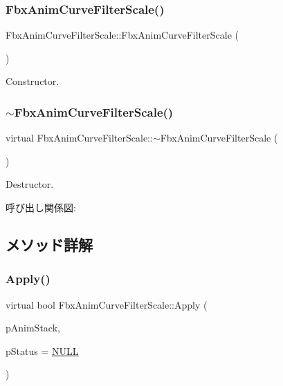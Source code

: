 \subsubsection{\texorpdfstring{Fbx\+Anim\+Curve\+Filter\+Scale()}{FbxAnimCurveFilterScale()}}
{\footnotesize\ttfamily Fbx\+Anim\+Curve\+Filter\+Scale\+::\+Fbx\+Anim\+Curve\+Filter\+Scale (\begin{DoxyParamCaption}{ }\end{DoxyParamCaption})}



Constructor. 

\mbox{\label{class_fbx_anim_curve_filter_scale_a2fa5db669596368d0b8cecff75468005}} 
\subsubsection{\texorpdfstring{$\sim$\+Fbx\+Anim\+Curve\+Filter\+Scale()}{~FbxAnimCurveFilterScale()}}
{\footnotesize\ttfamily virtual Fbx\+Anim\+Curve\+Filter\+Scale\+::$\sim$\+Fbx\+Anim\+Curve\+Filter\+Scale (\begin{DoxyParamCaption}{ }\end{DoxyParamCaption})\hspace{0.3cm}{\ttfamily [virtual]}}



Destructor. 

呼び出し関係図\+:


\subsection{メソッド詳解}
\mbox{\label{class_fbx_anim_curve_filter_scale_ac6fb7610299bd0fc1e399418f8d17b90}} 
\subsubsection{\texorpdfstring{Apply()}{Apply()}\hspace{0.1cm}{\footnotesize\ttfamily [1/5]}}
{\footnotesize\ttfamily virtual bool Fbx\+Anim\+Curve\+Filter\+Scale\+::\+Apply (\begin{DoxyParamCaption}\item[{\hyperlink{class_fbx_anim_stack}{Fbx\+Anim\+Stack} $\ast$}]{p\+Anim\+Stack,  }\item[{\hyperlink{class_fbx_status}{Fbx\+Status} $\ast$}]{p\+Status = {\ttfamily \hyperlink{fbxarch_8h_a070d2ce7b6bb7e5c05602aa8c308d0c4}{N\+U\+LL}} }\end{DoxyParamCaption})\hspace{0.3cm}{\ttfamily [virtual]}}

